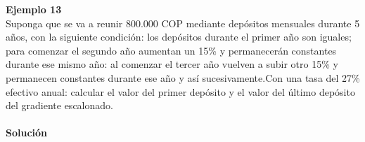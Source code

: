 \textbf{Ejemplo 13}\\
Suponga que se va a reunir  800.000 COP mediante depósitos mensuales durante 5 años, con la siguiente condición: los depósitos durante el primer año son iguales; para comenzar el segundo año aumentan un 15\% y permanecerán constantes durante ese mismo año: al comenzar el tercer año vuelven a subir otro 15\% y permanecen constantes durante ese año y así sucesivamente.Con una tasa del 27\% efectivo anual: calcular el valor del primer depósito y el valor del último depósito del gradiente escalonado.\\
\\

\textbf{Solución }\\
